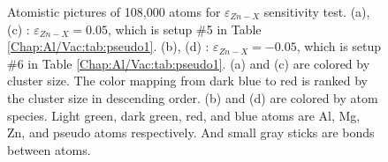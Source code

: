 \begin{figure}[!ht]
\caption[Atomistic pictures of 108,000 atoms for $\varepsilon_{Zn-X}$ sensitivity test.]{Atomistic pictures of 108,000 atoms for $\varepsilon_{Zn-X}$ sensitivity test. (a), (c) : $\varepsilon_{Zn-X} = 0.05$, which is setup \#5 in Table \ref{Chap:Al/Vac:tab:pseudo1}. (b), (d) : $\varepsilon_{Zn-X} = -0.05$, which is setup \#6 in Table \ref{Chap:Al/Vac:tab:pseudo1}. (a) and (c) are colored by cluster size. The color mapping from dark blue to red is ranked by the cluster size in descending order. (b) and (d) are colored by atom species. Light green, dark green, red, and blue atoms are Al, Mg, Zn, and pseudo atoms respectively. And small gray sticks are bonds between atoms.}
\label{Chap:Al/Vac:fig:sens_Zn}
\end{figure}
\endgroup